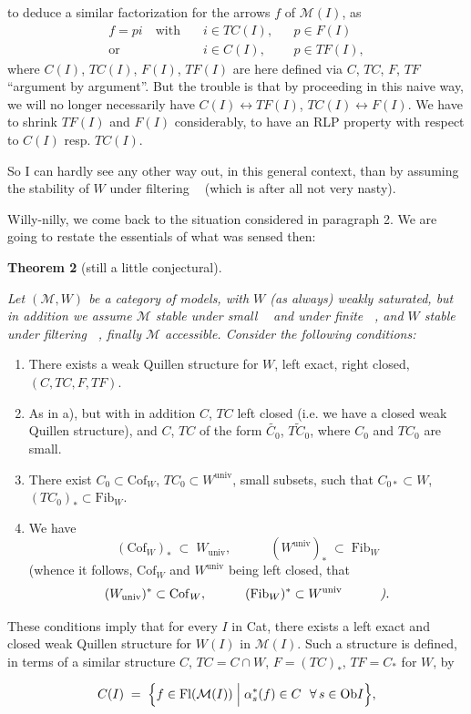 \documentclass[11pt]{article}
\newcommand{\printedpage}[1]{\marginpar{\footnotesize p.~#1}}
\newcommand{\msp}[1]{\marginpar{\footnotesize [#1]}}
\newcommand{\limind}{\mathop{\underrightarrow{\mathrm{lim}}}}
\newcommand{\limproj}{\mathop{\underleftarrow{\mathrm{lim}}}}
\newcommand{\M}{\mathcal{M}}
\newcommand{\Fl}{\mathrm{Fl}}
\newcommand{\Ob}{\mathrm{Ob}}
\newcommand{\Cof}{\mathrm{Cof}}
\newcommand{\Fib}{\mathrm{Fib}}
\newcommand{\univ}{\mathrm{univ}}
\begin{document}
\printedpage{24}
to deduce a similar factorization for the arrows $f$ of $\M(I)$, as
\[
\begin{aligned}
f = pi \quad \text{with}\quad & i \in TC(I), && p \in F(I)\\
\text{or}\quad & i \in C(I), && p \in TF(I),
\end{aligned}
\]
where $C(I)$, $TC(I)$, $F(I)$, $TF(I)$ are here defined via $C$, $TC$, $F$, $TF$ ``argument by argument''. But the trouble is that by proceeding in this naive way, we will no longer necessarily have $C(I) \longleftrightarrow TF(I)$, $TC(I) \longleftrightarrow F(I)$. We have to shrink $TF(I)$ and $F(I)$ considerably, to have an RLP property with respect to $C(I)$ resp. $TC(I)$.

So I can hardly see any other way out, in this general context, than by assuming the stability of $W$ under filtering $\limind$ (which is after all not very nasty).

\noindent\msp{page 42}

Willy-nilly, we come back to the situation considered in paragraph 2. We are going to restate the essentials of what was sensed then:

\textbf{Theorem 2} (still a little conjectural). {\itshape Let $(\M,W)$ be a category of models, with $W$ (as always) weakly saturated, but in addition we assume $\M$ stable under small $\limind$ and under finite $\limproj$, and $W$ stable under filtering $\limind$, finally $\M$ accessible. Consider the following conditions:

\begin{enumerate}
\item[\textup{a)}] There exists a weak Quillen structure for $W$, left exact, right closed, $(C,TC,F,TF)$.
\item[\textup{a$'$)}] As in \textup{a)}, but with in addition $C$, $TC$ left closed (\textup{i.e.} we have a closed weak Quillen structure), and $C$, $TC$ of the form $\widetilde{C_0}$, $\widetilde{TC_0}$, where $C_0$ and $TC_0$ are small.
\item[\textup{a$''$)}] There exist $C_0 \subset \Cof_W$, $TC_0 \subset W^{\univ}$, small subsets, such that $C_{0*} \subset W$, $(TC_0)_* \subset \Fib_W$.
\item[\textup{b)}] We have
\[
(\Cof_W)_* \;\subset\; W_{\univ}, \qquad\quad (W^{\univ})_* \;\subset\; \Fib_W
\]
(whence it follows, $\Cof_W$ and $W^{\univ}$ being left closed, that
\[
(W_{\univ})^* \subset \Cof_W, \qquad\quad (\Fib_W)^* \subset W^{\univ} \qquad\quad \text{\itshape ).}
\]
\end{enumerate}

\noindent\msp{page 43}

These conditions imply that for every $I$ in \textup{Cat}, there exists a left exact and closed weak Quillen structure for $W(I)$ in $\M(I)$. Such a structure is defined, in terms of a similar structure $C$, $TC = C \cap W$, $F = (TC)_*$, $TF = C_*$ for $W$, by}
\[
C(I) \;=\; \Bigl\{ f \in \Fl(\M(I)) \Bigm| \alpha_s^*(f) \in C \ \ \forall\, s \in \Ob I \Bigr\},
\]
\end{document}
